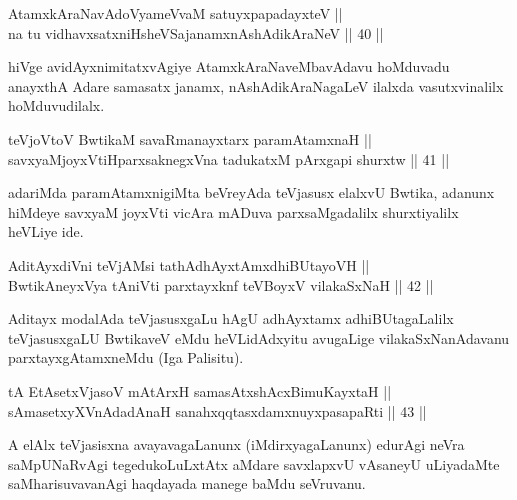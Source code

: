\begin{shl}
AtamxkAraNavAdoV\s yameVvaM satuyxpapadayxteV || \\
na tu vidhavxsatxniHsheVSajanamxnAshAdikAraNeV \hfill || 40 ||  
\end{shl}

\begin{artha}
hiVge avidAyxnimitatxvAgiye AtamxkAraNaveMbavAdavu hoMduvadu anayxthA
Adare samasatx janamx, nAshAdikAraNagaLeV ilalxda vasutxvinalilx
hoMduvudilalx.
\end{artha}


\begin{shl}
teVjoV\s toV BwtikaM savaRmanayxtarx paramAtamxnaH || \\
savxyaMjoyxVtiHparxsaknegxVna tadukatxM pArxgapi shurxtw \hfill || 41 ||  
\end{shl}

\begin{artha}
adariMda paramAtamxnigiMta beVreyAda teVjasusx elalxvU Bwtika, adanunx
hiMdeye savxyaM joyxVti vicAra mADuva parxsaMgadalilx shurxtiyalilx
heVLiye ide.
\end{artha}

\begin{shl}
AditAyxdiVni teVjAMsi tathA\s dhAyxtAmxdhiBUtayoVH || \\
BwtikAneyxVya tAniVti parxtayxknf teVBoyxV vilakaSxNaH \hfill || 42 ||  
\end{shl}

\begin{artha}
Aditayx modalAda teVjasusxgaLu hAgU adhAyxtamx adhiBUtagaLalilx
teVjasusxgaLU BwtikaveV eMdu heVLidAdxyitu avugaLige
vilakaSxNanAdavanu parxtayxgAtamxneMdu (Iga Palisitu).
\end{artha}

\begin{shl}
tA EtAsetxVjasoV mAtArxH samasAtxshAcx\s \s BimuKayxtaH || \\
sAmasetxyXVnA\s \s dadAnaH sanahxqqtasxdamxnuyxpasapaRti \hfill || 43 ||  
\end{shl}

\begin{artha}
A elAlx teVjasisxna avayavagaLanunx (iMdirxyagaLanunx) edurAgi neVra
saMpUNaRvAgi tegedukoLuLxtAtx aMdare savxlapxvU vAsaneyU uLiyadaMte
saMharisuvavanAgi haqdayada manege baMdu seVruvanu.
\end{artha}


